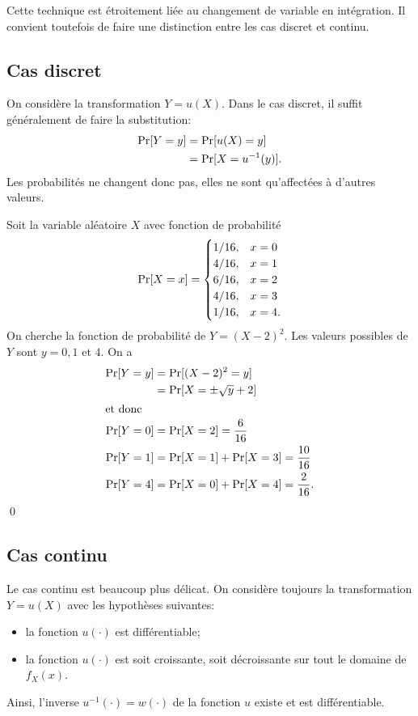 Cette technique est étroitement liée au changement de variable en
intégration. Il convient toutefois de faire une distinction entre les
cas discret et continu.

\subsection{Cas discret}

On considère la transformation $Y = u(X)$. Dans le cas discret, il
suffit généralement de faire la substitution:
\begin{align*}
  \operatorname{Pr} [ Y = y ]
  &= \operatorname{Pr} [ u(X) = y ] \\
  &= \operatorname{Pr} [ X = u^{-1}(y) ].
\end{align*}
Les probabilités ne changent donc pas, elles ne sont qu'affectées à
d'autres valeurs.

\begin{exemple}
  Soit la variable aléatoire $X$ avec fonction de probabilité
  \begin{displaymath}
    \operatorname{Pr} [ X = x ] =
    \begin{cases}
      1/16, & x = 0 \\
      4/16, & x = 1 \\
      6/16, & x = 2 \\
      4/16, & x = 3 \\
      1/16, & x = 4.
    \end{cases}
  \end{displaymath}
  On cherche la fonction de probabilité de $Y = (X - 2)^2$. Les
  valeurs possibles de $Y$ sont $y = 0, 1$ et $4$. On a
  \begin{align*}
    \operatorname{Pr} [ Y = y ]
    &= \operatorname{Pr} [ (X - 2)^2 = y ] \\
    &= \operatorname{Pr} [ X = \pm \sqrt{y} + 2 ] \\
    \intertext{et donc}
    \operatorname{Pr} [ Y = 0 ]  &= \operatorname{Pr} [ X = 2 ] = \frac{6}{16} \\
    \operatorname{Pr} [ Y = 1 ]  &= \operatorname{Pr} [ X = 1 ] + \operatorname{Pr} [ X = 3 ]  = \frac{10}{16} \\
    \operatorname{Pr} [ Y = 4 ]  &= \operatorname{Pr} [ X = 0 ] + \operatorname{Pr} [ X = 4 ]  = \frac{2}{16}.
  \end{align*}
  \qed
\end{exemple}

\subsection{Cas continu}

Le cas continu est beaucoup plus délicat. On considère toujours la
transformation $Y = u(X)$ avec les hypothèses suivantes:
\begin{itemize}
\item la fonction $u(\cdot)$ est différentiable;
\item la fonction $u(\cdot)$ est soit croissante, soit décroissante
  sur tout le domaine de $f_X(x)$.
\end{itemize}
Ainsi, l'inverse $u^{-1}(\cdot) = w(\cdot)$ de la fonction $u$ existe
et est différentiable.

